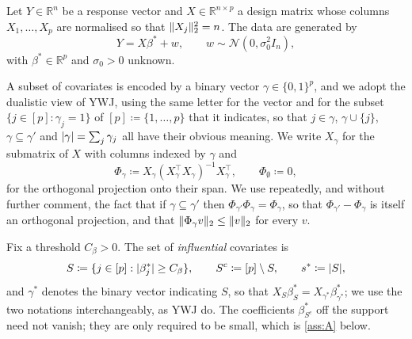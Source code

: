 \documentclass[aos]{imsart}
\DeclarePairedDelimiter{\norm}{\lVert}{\rVert}
\DeclarePairedDelimiter{\abs}{\lvert}{\rvert}
\newcommand{\bbR}[0]{\mathbb{R}}
\newcommand{\calN}[0]{\mathcal{N}}
\newcommand{\signal}{X_{\gamma^{\ast}}\beta^{\ast}_{\gamma^{\ast}}}
\theoremstyle{plain}
\theoremstyle{definition}
\begin{document}
    Let $Y\in\bbR^{n}$ be a response vector and $X\in\bbR^{n\times p}$ a
    design matrix whose columns $X_1,\dots,X_p$ are normalised so that
    $\norm{X_j}_2^{2}=n$. The data are generated by
    \begin{equation}
        \label{eq:linear}
        Y=X\beta^{\ast}+w,\qquad w\sim\calN(0,\sigma_0^{2}I_n),
    \end{equation}
    with $\beta^\ast\in\bbR^{p}$ and $\sigma_0>0$ unknown.

    A subset of covariates is encoded by a binary vector
    $\gamma\in\{0,1\}^{p}$, and we adopt the dualistic view of YWJ, using the
    same letter for the vector and for the subset $\{j\in[p]:\gamma_j=1\}$ of
    $[p]\coloneq\{1,\dots,p\}$ that it indicates, so that $j\in\gamma$,
    $\gamma\cup\{j\}$, $\gamma\subseteq\gamma'$ and
    $\abs{\gamma}=\sum_j\gamma_j$ all have their obvious meaning. We write
    $X_\gamma$ for the submatrix of $X$ with columns indexed by $\gamma$ and
    \begin{equation}
        \label{eq:proj}
        \Phi_\gamma\coloneq
        X_\gamma(X_\gamma^{\top}X_\gamma)^{-1}X_\gamma^{\top},
        \qquad \Phi_\emptyset\coloneq0,
    \end{equation}
    for the orthogonal projection onto their span. We use repeatedly, and
    without further comment, the fact that if $\gamma\subseteq\gamma'$ then
    $\Phi_{\gamma'}\Phi_\gamma=\Phi_\gamma$, so that
    $\Phi_{\gamma'}-\Phi_\gamma$ is itself an orthogonal projection, and that
    $\norm{\Phi_\gamma v}_2\leq\norm{v}_2$ for every $v$.

    Fix a threshold $C_\beta>0$. The set of \emph{influential} covariates is
    \begin{equation}
        \label{eq:S}
        S\coloneq\{j\in[p]:\abs{\beta^\ast_j}\geq C_\beta\},
        \qquad
        S^{c}\coloneq[p]\setminus S,
        \qquad
        s^{\ast}\coloneq\abs{S},
    \end{equation}
    and $\gamma^{\ast}$ denotes the binary vector indicating $S$, so that
    $X_S\beta^\ast_S=\signal$; we use the two notations interchangeably, as
    YWJ do. The coefficients $\beta^\ast_{S^{c}}$ off the support need not
    vanish; they are only required to be small, which is \cref{ass:A} below.
\end{document}
